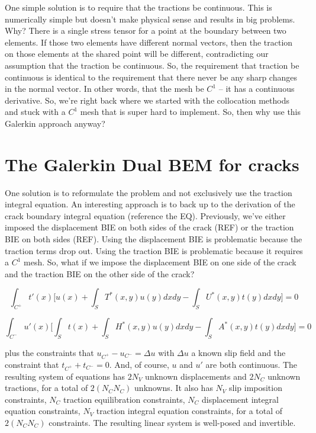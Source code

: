 \documentclass{article}
\begin{document}
{One simple solution is to require that the tractions be continuous. This is numerically simple but doesn't make physical sense and results in big problems. Why? There is a single stress tensor for a point at the boundary between two elements. If those two elements have different normal vectors, then the traction on those elements at the shared point will be different, contradicting our assumption that the traction be continuous. So, the requirement that traction be continuous is identical to the requirement that there never be any sharp changes in the normal vector. In other words, that the mesh be $C^1$ -- it has a continuous derivative. So, we're right back where we started with the collocation methods and stuck with a $C^1$ mesh that is super hard to implement. So, then why use this Galerkin approach anyway? 

\section{The Galerkin Dual BEM for cracks}

One solution is to reformulate the problem and not exclusively use the traction integral equation. An interesting approach is to back up to the derivation of the crack boundary integral equation (reference the EQ). Previously, we've either imposed the displacement BIE on both sides of the crack (REF) or the traction BIE on both sides (REF). Using the displacement BIE is problematic because the traction terms drop out. Using the traction BIE is problematic because it requires a $C^1$ mesh. So, what if we impose the displacement BIE on one side of the crack and the traction BIE on the other side of the crack? 

\begin{equation}
    \int_{C^+} t'(x) \Big[ u(x) +
    \int_{S} T^*(x,y) u(y) dx dy -
    \int_{S} U^*(x,y) t(y) dx dy \Big] = 0
\end{equation}

\begin{equation}
    \int_{C^-} u'(x) \Big[ \int_{S} t(x) +
    \int_{S} H^*(x,y) u(y) dx dy -
    \int_{S} A^*(x,y) t(y) dx dy \Big] = 0
\end{equation}

plus the constraints that $u_{C^+} - u_{C^-} = \Delta u$ with $\Delta u$ a known slip field and the constraint that $t_{C^+} + t_{C^-} = 0$. And, of course, $u$ and $u'$ are both continuous. The resulting system of equations has $2N_V$ unknown displacements and $2N_{C}$ unknown tractions, for a total of $2(N_C N_C)$ unknowns. It also has $N_V$ slip imposition constraints, $N_C$ traction equilibration constraints, $N_C$ displacement integral equation constraints, $N_V$ traction integral equation constraints, for a total of $2(N_C N_C)$ constraints. The resulting linear system is well-posed and invertible.

}
\end{document}
